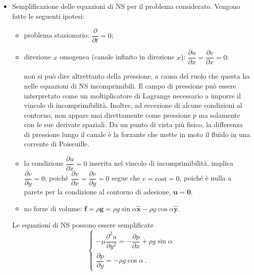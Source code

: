 \begin{itemize}
  \item Semplificazione delle equazioni di NS per il problema considerato. Vengono fatte le seguenti ipotesi:
\begin{itemize}
\item problema stazionario: $\dfrac{\partial}{\partial t} = 0$;
\item direzione $x$ omogenea (canale infinito in direzione $x$): $\dfrac{\partial u}{\partial x} = \dfrac{\partial v}{\partial x} = 0$; 
\begin{remark}
non si può dire altrettanto della pressione, a causa del ruolo che questa ha nelle equazioni di NS incomprimibili. Il campo di pressione può essere interpretato come un moltiplicatore di Lagrange necessario a imporre il vincolo di incomprimibilità. Inoltre, ad eccezione di alcune condizioni al contorno, non appare mai direttamente come pressione $p$ ma solamente con le sue derivate spaziali. Da un punto di vista più fisico, la differenza di pressione lungo il canale è la forzante che mette in moto il fluido in una corrente di Poiseuille.
\end{remark}
\item la condizione $\dfrac{\partial u}{\partial x} = 0$ inserita nel vincolo di incomprimibilità, implica $\dfrac{\partial v}{\partial y}=0$; poichè $\dfrac{\partial v}{\partial x}=\dfrac{\partial v}{\partial y}=0$ segue che $v = \text{cost} = 0$, poiché è nulla a parete per la condizione al contorno di adesione, $\bm{u} = \bm{0}$.
\item no forze di volume: $\bm{f} = \rho \bm{g} = \rho g \sin \alpha \bm{\hat{x}} - \rho g \cos \alpha \bm{\hat{y}}$.
\end{itemize}
%
Le equazioni di NS possono essere semplificate 
\begin{equation}
\begin{cases}
  - \mu \dfrac{\partial^2 u}{\partial y^2} = - \dfrac{\partial p}{\partial x} + \rho g \sin \alpha \\
  \dfrac{\partial p}{\partial y} = - \rho g \cos \alpha \ .
\end{cases}
\end{equation}


\end{itemize}
